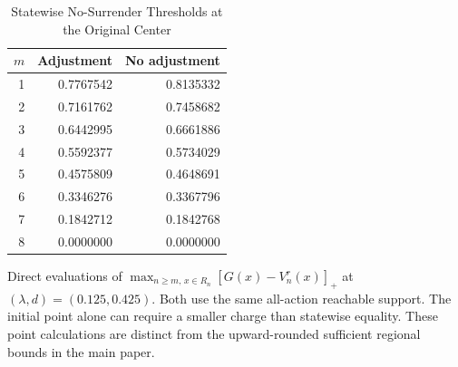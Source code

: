 \begin{table}[tbp]
\centering\small
\caption{Statewise No-Surrender Thresholds at the Original Center}
\label{tab:r9_center_capacity}
\begin{tabular}{rrr}
\toprule
$m$ & Adjustment & No adjustment \\
\midrule
1 & 0.7767542 & 0.8135332 \\
2 & 0.7161762 & 0.7458682 \\
3 & 0.6442995 & 0.6661886 \\
4 & 0.5592377 & 0.5734029 \\
5 & 0.4575809 & 0.4648691 \\
6 & 0.3346276 & 0.3367796 \\
7 & 0.1842712 & 0.1842768 \\
8 & 0.0000000 & 0.0000000 \\
\bottomrule
\end{tabular}
\begin{minipage}{0.98\textwidth}\footnotesize\medskip
Direct evaluations of $\max_{n\geq m,\,x\in R_n}[G(x)-V_n^r(x)]_+$ at $(\lambda,d)=(0.125,0.425)$. Both use the same all-action reachable support. The initial point alone can require a smaller charge than statewise equality. These point calculations are distinct from the upward-rounded sufficient regional bounds in the main paper.
\end{minipage}
\end{table}
